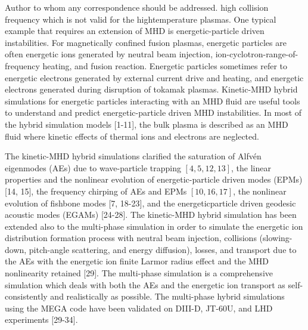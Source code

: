 \documentclass[10pt]{article}
\begin{document}
Author to whom any correspondence should be addressed. high collision frequency which is not valid for the hightemperature plasmas. One typical example that requires an extension of MHD is energetic-particle driven instabilities. For magnetically confined fusion plasmas, energetic particles are often energetic ions generated by neutral beam injection, ion-cyclotron-range-of-frequency heating, and fusion reaction. Energetic particles sometimes refer to energetic electrons generated by external current drive and heating, and energetic electrons generated during disruption of tokamak plasmas. Kinetic-MHD hybrid simulations for energetic particles interacting with an MHD fluid are useful tools to understand and predict energetic-particle driven MHD instabilities. In most of the hybrid simulation models [1-11], the bulk plasma is described as an MHD fluid where kinetic effects of thermal ions and electrons are neglected.

The kinetic-MHD hybrid simulations clarified the saturation of Alfvén eigenmodes (AEs) due to wave-particle trapping $[4,5,12,13]$, the linear properties and the nonlinear evolution of energetic-particle driven modes (EPMs) [14, 15], the frequency chirping of AEs and EPMs $[10,16,17]$, the nonlinear evolution of fishbone modes [7, 18-23], and the energeticparticle driven geodesic acoustic modes (EGAMs) [24-28]. The kinetic-MHD hybrid simulation has been extended also to the multi-phase simulation in order to simulate the energetic ion distribution formation process with neutral beam injection, collisions (slowing-down, pitch-angle scattering, and energy diffusion), losses, and transport due to the AEs with the energetic ion finite Larmor radius effect and the MHD nonlinearity retained [29]. The multi-phase simulation is a comprehensive simulation which deals with both the AEs and the energetic ion transport as self-consistently and realistically as possible. The multi-phase hybrid simulations using the MEGA code have been validated on DIII-D, JT-60U, and LHD experiments [29-34].
\end{document}
